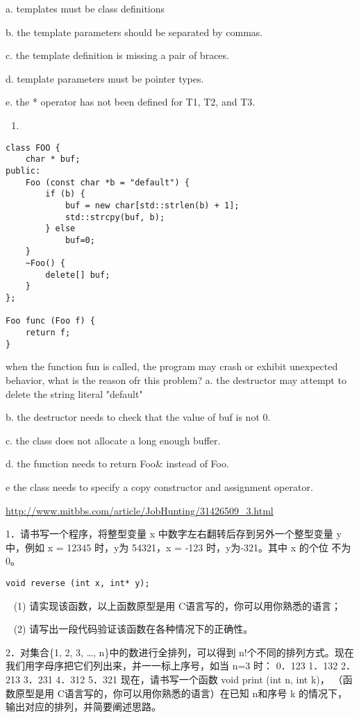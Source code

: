 \documentclass[12pt]{book}
\begin{document}
a. templates must be class definitions

b. the template parameters should be separated by commas.

c. the template definition is missing a pair of braces.

d. template parameters must be pointer types.

e. the * operator has not been defined for T1, T2, and T3.

\begin{enumerate}
\item 
\end{enumerate}
\lstset{language=java,label= ,caption= ,numbers=none}
\begin{lstlisting}
class FOO {
    char * buf;
public:
    Foo (const char *b = "default") {
        if (b) {
            buf = new char[std::strlen(b) + 1];
            std::strcpy(buf, b);
        } else         
            buf=0;
    }
    ~Foo() {
        delete[] buf;
    }
};

Foo func (Foo f) {
    return f;
}
\end{lstlisting}
when the function fun is called, the program may crash or exhibit
unexpected behavior, what is the reason ofr this problem?
a. the destructor may attempt to delete the string literal "default"

b. the destructor needs to check that the value of buf is not 0.

c. the class does not allocate a long enough buffer.

d. the function needs to return Foo\& instead of Foo.

e  the class needs to specify a copy constructor and assignment operator.

\url{http://www.mitbbs.com/article/JobHunting/31426509_3.html}

1．请书写一个程序，将整型变量 x 中数字左右翻转后存到另外一个整型变量 y
中，例如 x = 12345 时，y为 54321，x = ‐123 时，y为‐321。其中 x 的个位
不为 0。   
\lstset{language=java,label= ,caption= ,numbers=none}
\begin{lstlisting}
void reverse (int x, int* y);
\end{lstlisting}
~ (1)  请实现该函数，以上函数原型是用 C语言写的，你可以用你熟悉的语言； 

~ (2)  请写出一段代码验证该函数在各种情况下的正确性。 

2．对集合\{1, 2, 3, …, n\}中的数进行全排列，可以得到 n!个不同的排列方式。现在我们用字母序把它们列出来，并一一标上序号，如当 n=3 时：  0．123   1．132   2．213   3．231   4．312   5．321 现在，请书写一个函数 void print (int n, int k)， （函数原型是用 C语言写的，你可以用你熟悉的语言）在已知 n和序号 k 的情况下，输出对应的排列，并简要阐述思路。 
\end{document}
